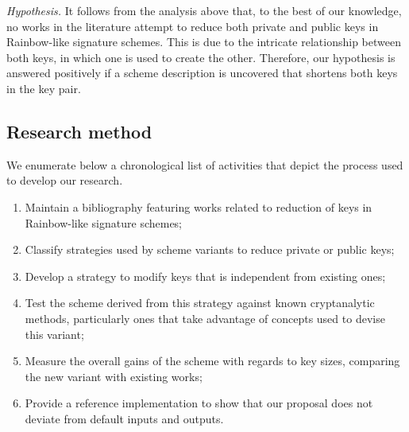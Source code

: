 \documentclass[draft, 12pt, a4paper, oneside]{memoir}
\begin{document}
\emph{Hypothesis.} It follows from the analysis above that, to the best of our knowledge, no works in the literature attempt to reduce both private and public keys in Rainbow-like signature schemes. This is due to the intricate relationship between both keys, in which one is used to create the other. Therefore, our hypothesis is answered positively if a scheme description is uncovered that shortens both keys in the key pair.

\subsection{Research method}

We enumerate below a chronological list of activities that depict the process used to develop our research.

\begin{enumerate}[label=(\roman*), itemsep=1pt]
    \item Maintain a bibliography featuring works related to reduction of keys in Rainbow-like signature schemes;
    \item Classify strategies used by scheme variants to reduce private or public keys;
    \item Develop a strategy to modify keys that is independent from existing ones;
    \item Test the scheme derived from this strategy against known cryptanalytic methods, particularly ones that take advantage of concepts used to devise this variant;
    \item Measure the overall gains of the scheme with regards to key sizes, comparing the new variant with existing works;
    \item Provide a reference implementation to show that our proposal does not deviate from default inputs and outputs.
\end{enumerate}



\end{document}
